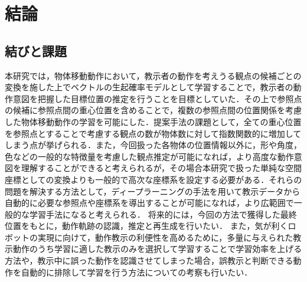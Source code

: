 ﻿%
\chapter{結論}

\section{結びと課題}

本研究では，物体移動動作において，教示者の動作を考えうる観点の候補ごとの変換を施した上でベクトルの生起確率モデルとして学習することで，教示者の動作意図を把握した目標位置の推定を行うことを目標としていた．その上で参照点の候補に参照点間の重心位置を含めることで，複数の参照点間の位置関係を考慮した物体移動動作の学習を可能にした．提案手法の課題として，全ての重心位置を参照点とすることで考慮する観点の数が物体数に対して指数関数的に増加してしまう点が挙げられる．また，今回扱った各物体の位置情報以外に，形や角度，色などの一般的な特徴量を考慮した観点推定が可能になれば，より高度な動作意図を理解することができると考えられるが，その場合本研究で扱った単純な空間座標としての変換よりも一般的で高次な座標系を設定する必要がある．それらの問題を解決する方法として，ディープラーニング\cite{deep}の手法を用いて教示データから自動的に必要な参照点や座標系を導出することが可能になれば，より広範囲で一般的な学習手法になると考えられる．
将来的には，今回の方法で獲得した最終位置をもとに，動作軌跡の認識，推定と再生成を行いたい．
また，気が利くロボットの実現に向けて，動作教示の利便性を高めるために，多量に与えられた教示動作のうち学習に適した教示のみを選択して学習することで学習効率を上げる方法や，教示中に誤った動作を認識させてしまった場合，誤教示と判断できる動作を自動的に排除して学習を行う方法についての考察も行いたい．

